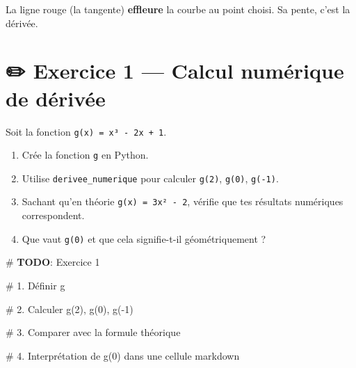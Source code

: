 \documentclass[
  french,
  11pt,
  a4paper,
]{scrbook}
\newenvironment{Shaded}{}{}
\newcommand{\AlertTok}[1]{\textcolor[rgb]{1.00,0.33,0.33}{\textbf{#1}}}
\newcommand{\CommentTok}[1]{\textcolor[rgb]{0.42,0.45,0.49}{#1}}
\providecommand{\tightlist}{%
  \setlength{\itemsep}{0pt}\setlength{\parskip}{0pt}}
\begin{document}
La ligne rouge (la tangente) \textbf{effleure} la courbe au point
choisi. Sa pente, c'est la dérivée.

\section{✏️ Exercice 1 --- Calcul numérique de
dérivée}\label{exercice-1-calcul-numuxe9rique-de-duxe9rivuxe9e}

\begin{tcolorbox}[enhanced jigsaw, arc=.35mm, bottomrule=.15mm, bottomtitle=1mm, breakable, colback=white, colbacktitle=quarto-callout-note-color!10!white, colframe=quarto-callout-note-color-frame, coltitle=black, left=2mm, leftrule=.75mm, opacityback=0, opacitybacktitle=0.6, rightrule=.15mm, title={📝 Énoncé}, titlerule=0mm, toprule=.15mm, toptitle=1mm]

Soit la fonction \texttt{g(x)\ =\ x³\ -\ 2x\ +\ 1}.

\begin{enumerate}
\def\labelenumi{\arabic{enumi}.}
\tightlist
\item
  Crée la fonction \texttt{g} en Python.
\item
  Utilise \texttt{derivee\_numerique} pour calculer
  \texttt{g\textquotesingle{}(2)}, \texttt{g\textquotesingle{}(0)},
  \texttt{g\textquotesingle{}(-1)}.
\item
  Sachant qu'en théorie \texttt{g\textquotesingle{}(x)\ =\ 3x²\ -\ 2},
  vérifie que tes résultats numériques correspondent.
\item
  Que vaut \texttt{g\textquotesingle{}(0)} et que cela signifie-t-il
  géométriquement ?
\end{enumerate}

\end{tcolorbox}

\begin{Shaded}
\begin{Highlighting}[]
\CommentTok{\# }\AlertTok{TODO}\CommentTok{: Exercice 1}

\CommentTok{\# 1. Définir g}


\CommentTok{\# 2. Calculer g\textquotesingle{}(2), g\textquotesingle{}(0), g\textquotesingle{}({-}1)}


\CommentTok{\# 3. Comparer avec la formule théorique}


\CommentTok{\# 4. Interprétation de g\textquotesingle{}(0) dans une cellule markdown}
\end{Highlighting}
\end{Shaded}
\end{document}
